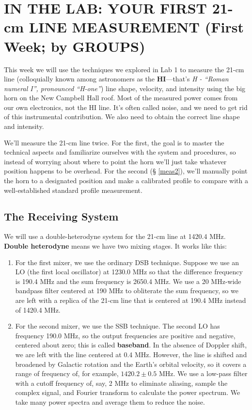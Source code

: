 \documentclass[12pt,preprint]{aastex}
\begin{document}
\section{IN THE LAB: YOUR FIRST 21-cm LINE MEASUREMENT (First Week; by GROUPS)} 
\label{radioastro}

This week we will use the techniques we explored in Lab 1 to measure the
21-cm line (colloquially known among astronomers as the {\bf
  HI}---that's {\it H - ``Roman numeral I'', pronounced ``H-one''}) line
shape, velocity, and intensity using the big horn on the New Campbell Hall roof.
Most of the measured power comes from our own electronics, not the HI
line.  It's often called noise, and we need to get rid of this
instrumental contribution. We also need to obtain the correct line shape
and intensity.

We'll measure the 21-cm line twice. For the first, the goal is to master
the technical aspects and familiarize ourselves with the system and
procedures, so instead of worrying about where to point the horn we'll
just take whatever position happens to be overhead. For the second (\S
\ref{meas2}), we'll manually point the horn to a designated position and
make a calibrated profile to compare with a well-established standard
profile measurement.

\subsection{The Receiving System}
We will use a double-heterodyne system for the 21-cm line at 1420.4 MHz.
{\bf Double heterodyne} means we have two mixing stages.  It works
like this: \begin{enumerate}

\item For the first mixer, we use the ordinary DSB technique. Suppose we
  use an LO (the first local oscillator) at 1230.0 MHz so that the
  difference frequency is 190.4 MHz and the sum frequency is 2650.4 MHz.
  We use a 20 MHz-wide bandpass filter centered at 190 MHz to obliterate
  the sum frequency, so we are left with a replica of the 21-cm line
  that is centered at 190.4 MHz instead of 1420.4 MHz.

\item For the second mixer, we use the SSB technique. The second
  LO has frequency 190.0 MHz, so the output frequencies are positive
  and negative, centered about zero; this is called {\bf baseband}. In the
  absence of Doppler shift, we are left with the line centered at 0.4
  MHz. However, the line is shifted and broadened by Galactic rotation
  and the Earth's orbital velocity, so it covers a range of frequency
  of, for example, $1420.2 \pm 0.5$ MHz. We use a low-pass filter with a
  cutoff frequency of, say, 2 MHz to
  eliminate aliasing, sample the complex signal, and Fourier transform
  to calculate the power spectrum. We take many power spectra and
  average them to reduce the noise.

\end{enumerate}
\end{document}
